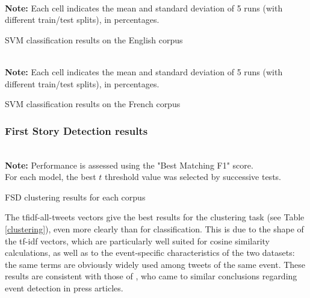 \begin{table}[ht]
\begin{center}
\\

{\scriptsize \textbf{Note:} Each cell indicates the mean and standard deviation of 5 runs (with different train/test splits), in percentages.}
\caption{SVM classification results on the English corpus} \label{classif_en}
\end{center}
\end{table}

\begin{table}[ht]
\begin{center}
\\

{\scriptsize \textbf{Note:} Each cell indicates the mean and standard deviation of 5 runs (with different train/test splits), in percentages.}
\caption{SVM classification results on the French corpus} \label{classif_fr}
\end{center}
\end{table}


\subsubsection{First Story Detection results}

\begin{table}[ht]
\begin{center}

\\

{\scriptsize \textbf{Note:} Performance is assessed using the "Best Matching F1" score.\\ 
For each model, the best $t$ threshold value was selected by successive tests.}
\caption{FSD clustering results for each corpus} \label{clustering}
\end{center}
\end{table}

The tfidf-all-tweets vectors give the best results for the clustering task (see Table \ref{clustering}), even more clearly than for classification. This is due to the shape of the tf-idf vectors, which are particularly well suited for cosine similarity calculations, as well as to the event-specific characteristics of the two datasets: the same terms are obviously widely used among tweets of the same event.
These results are consistent with those of \citet{cage2020production}, who came to similar conclusions regarding event detection in press articles.


